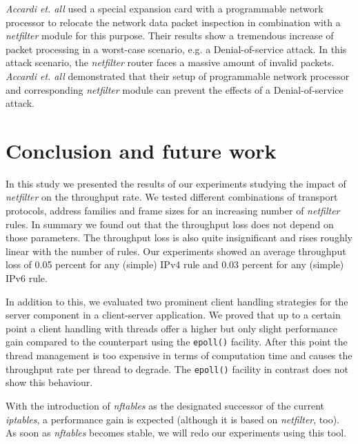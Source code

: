 \documentclass{sig-alternate}
\begin{document}
\emph{Accardi et. all} \cite{accardi2005network} used a special expansion card 
with a programmable network processor to relocate the network data packet 
inspection in combination with a \emph{netfilter} module for this purpose. 
Their 
results show a tremendous increase of packet processing in a worst-case 
scenario, e.g. a Denial-of-service attack. In this attack scenario, the 
\emph{netfilter} router faces a massive amount of invalid packets. 
\emph{Accardi 
et. all} demonstrated that their setup of programmable network processor and 
corresponding \emph{netfilter} module can prevent the effects of a 
Denial-of-service attack.

\section{Conclusion and future work}
\noindent In this study we presented the results of our experiments studying 
the impact of \emph{netfilter} on the throughput rate. We tested different 
combinations of transport protocols, address families and frame sizes for an 
increasing number of \emph{netfilter} rules. In summary we found out that the 
throughput loss does not depend on those pa\-ra\-me\-ters. The throughput loss 
is also quite insignificant and rises roughly linear with the number of rules. 
Our experiments showed an average throughput loss of 0.05 percent for any 
(simple) IPv4 rule and 0.03 percent for any (simple) IPv6 rule.

In addition to this, we evaluated two prominent client handling strategies for 
the server component in a client-server application. We proved that up to a 
certain point a client handling with threads offer a higher but only slight 
performance gain compared to the counterpart using the \texttt{epoll()}
facility. After this point the thread management is too expensive in terms of 
computation time and causes the throughput rate per thread to degrade. The 
\texttt{epoll()} facility in contrast does not show this behaviour.

With the introduction of \emph{nftables} as the designated successor 
of the current \emph{iptables}, a performance gain is expected (although it is 
based on \emph{netfilter}, too). As soon as \emph{nftables} becomes stable, we 
will redo our experiments using this tool.


\end{document}
